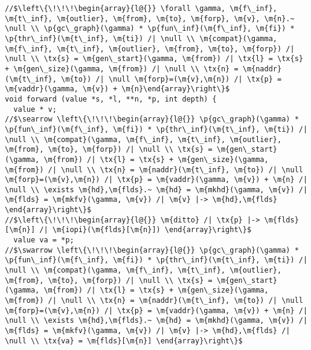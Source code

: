  
\begin{figure*}
\vspace{-1ex}
  \begin{lstlisting}[multicols=2]
//$\left\{\!\!\!\begin{array}{l@{}} \forall \gamma, \m{f\_inf}, \m{t\_inf}, \m{outlier}, \m{from}, \m{to}, \m{forp}, \m{v}, \m{n}.~ \null \\ \p{gc\_graph}(\gamma) * \p{fun\_inf}(\m{f\_inf}, \m{fi}) * \p{thr\_inf}(\m{t\_inf}, \m{ti}) /| \null \\ \m{compat}(\gamma, \m{f\_inf}, \m{t\_inf}, \m{outlier}, \m{from}, \m{to}, \m{forp}) /| \null \\ \tx{s} = \m{gen\_start}(\gamma, \m{from}) /| \tx{l} = \tx{s} + \m{gen\_size}(\gamma, \m{from}) /| \null \\ \tx{n} = \m{naddr}(\m{t\_inf}, \m{to}) /| \null \m{forp}=(\m{v},\m{n}) /| \tx{p} = \m{vaddr}(\gamma, \m{v}) + \m{n}\end{array}\right\}$
void forward (value *s, *l, **n, *p, int depth) {
  value * v;
//$\searrow \left\{\!\!\!\begin{array}{l@{}} \p{gc\_graph}(\gamma) * \p{fun\_inf}(\m{f\_inf}, \m{fi}) * \p{thr\_inf}(\m{t\_inf}, \m{ti}) /| \null \\ \m{compat}(\gamma, \m{f\_inf}, \m{t\_inf}, \m{outlier}, \m{from}, \m{to}, \m{forp}) /| \null \\ \tx{s} = \m{gen\_start}(\gamma, \m{from}) /| \tx{l} = \tx{s} + \m{gen\_size}(\gamma, \m{from}) /| \null \\ \tx{n} = \m{naddr}(\m{t\_inf}, \m{to}) /| \null \m{forp}=(\m{v},\m{n}) /| \tx{p} = \m{vaddr}(\gamma, \m{v}) + \m{n} /| \null \\ \exists \m{hd},\m{flds}.~ \m{hd} = \m{mkhd}(\gamma, \m{v}) /| \m{flds} = \m{mkfv}(\gamma, \m{v}) /| \m{v} |-> \m{hd},\m{flds} \end{array}\right\}$
//$\left\{\!\!\!\begin{array}{l@{}} \m{ditto} /| \tx{p} |-> \m{flds}[\m{n}] /| \m{iopi}(\m{flds}[\m{n}]) \end{array}\right\}$
  value va = *p; 
//$\swarrow \left\{\!\!\!\begin{array}{l@{}} \p{gc\_graph}(\gamma) * \p{fun\_inf}(\m{f\_inf}, \m{fi}) * \p{thr\_inf}(\m{t\_inf}, \m{ti}) /| \null \\ \m{compat}(\gamma, \m{f\_inf}, \m{t\_inf}, \m{outlier}, \m{from}, \m{to}, \m{forp}) /| \null \\ \tx{s} = \m{gen\_start}(\gamma, \m{from}) /| \tx{l} = \tx{s} + \m{gen\_size}(\gamma, \m{from}) /| \null \\ \tx{n} = \m{naddr}(\m{t\_inf}, \m{to}) /| \null \m{forp}=(\m{v},\m{n}) /| \tx{p} = \m{vaddr}(\gamma, \m{v}) + \m{n} /| \null \\ \exists \m{hd},\m{flds}.~ \m{hd} = \m{mkhd}(\gamma, \m{v}) /| \m{flds} = \m{mkfv}(\gamma, \m{v}) /| \m{v} |-> \m{hd},\m{flds} /| \null \\ \tx{va} = \m{flds}[\m{n}] \end{array}\right\}$

\end{lstlisting}
\end{figure*}
